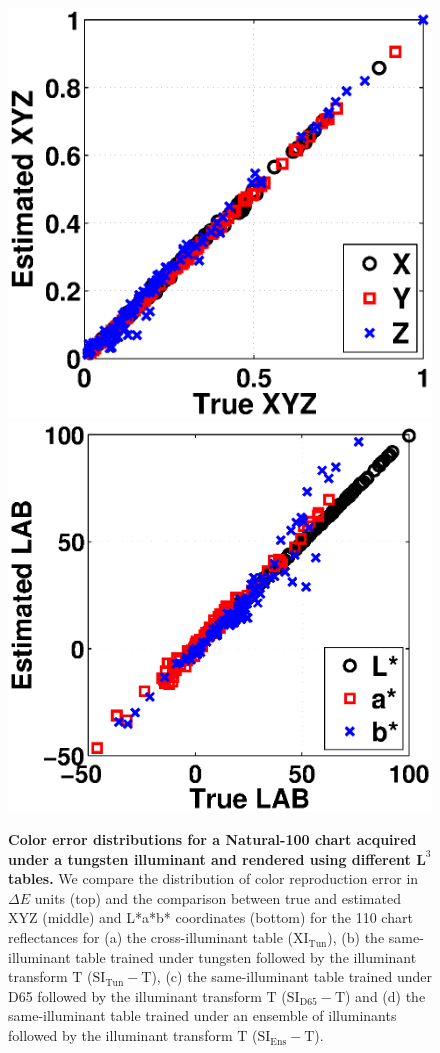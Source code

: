 \documentclass[]{spie}
\newcommand{\Lcube}{\boldsymbol L^3}
\newcommand{\XIT}{\mathrm{XI_{Tun}}}
\newcommand{\SITT}{\mathrm{SI_{Tun}-T}}
\newcommand{\SIDT}{\mathrm{SI_{D65}-T}}
\newcommand{\SIET}{\mathrm{SI_{Ens}-T}}
\newcommand{\TT}{\mathrm{T}}
\begin{document}
\begin{figure}[t]
\begin{center}
\begin{minipage}[b]{0.245\textwidth}
 \includegraphics[width=\textwidth]{Fig5/XYZ_Tungsten2_RGBW1_6}
 \includegraphics[width=\textwidth]{Fig5/LAB_Tungsten2_RGBW1_6}
 \centering\small\text{(d) $\SIET$}
\end{minipage}
\end{center}
\caption{\textbf{Color error distributions for a Natural-100 chart acquired under a tungsten illuminant and rendered using different $\Lcube$ tables.} We compare the distribution of color reproduction error in $\Delta E$ units (top) and the comparison between true and estimated XYZ (middle) and L*a*b* coordinates (bottom) for the 110 chart reflectances for (a) the cross-illuminant table ($\XIT$), (b) the same-illuminant table trained under tungsten followed by the illuminant transform $\TT$ ($\SITT$), (c) the same-illuminant table trained under D65 followed by the illuminant transform $\TT$ ($\SIDT$) and (d) the same-illuminant table trained under an ensemble of illuminants followed by the illuminant transform $\TT$ ($\SIET$).}

\end{figure}
\end{document}
